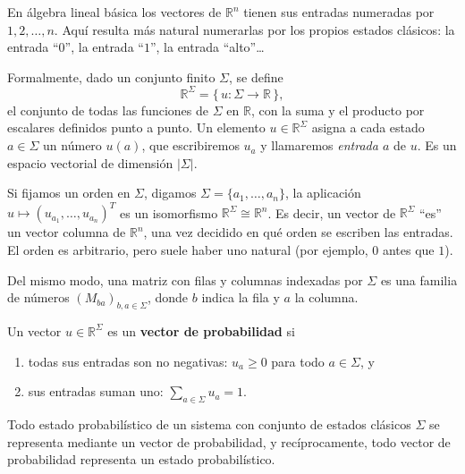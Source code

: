 \documentclass[11pt, a4paper, twoside, openright]{report}
\begin{document}
\begin{tcolorbox}[colback=teal!5!white,colframe=teal!75!black,title=\textbf{Nota Teórica: Vectores indexados por un conjunto}]
En álgebra lineal básica los vectores de $\mathbb{R}^n$ tienen sus entradas numeradas por $1, 2, \dots, n$. Aquí resulta más natural numerarlas por los propios estados clásicos: la entrada ``$0$'', la entrada ``$1$'', la entrada ``alto''\dots

Formalmente, dado un conjunto finito $\Sigma$, se define
\[ \mathbb{R}^{\Sigma} = \{\, u : \Sigma \to \mathbb{R} \,\}, \]
el conjunto de todas las funciones de $\Sigma$ en $\mathbb{R}$, con la suma y el producto por escalares definidos punto a punto. Un elemento $u \in \mathbb{R}^\Sigma$ asigna a cada estado $a \in \Sigma$ un número $u(a)$, que escribiremos $u_a$ y llamaremos \textit{entrada $a$} de $u$. Es un espacio vectorial de dimensión $|\Sigma|$.

Si fijamos un orden en $\Sigma$, digamos $\Sigma = \{a_1, \dots, a_n\}$, la aplicación $u \mapsto (u_{a_1}, \dots, u_{a_n})^T$ es un isomorfismo $\mathbb{R}^\Sigma \cong \mathbb{R}^n$. Es decir, un vector de $\mathbb{R}^\Sigma$ ``es'' un vector columna de $\mathbb{R}^n$, una vez decidido en qué orden se escriben las entradas. El orden es arbitrario, pero suele haber uno natural (por ejemplo, $0$ antes que $1$).

Del mismo modo, una matriz con filas y columnas indexadas por $\Sigma$ es una familia de números $(M_{ba})_{b, a \in \Sigma}$, donde $b$ indica la fila y $a$ la columna.
\end{tcolorbox}

\begin{tcolorbox}[colback=teal!5!white,colframe=teal!75!black,title=\textbf{Definición: Vector de probabilidad}]
Un vector $u \in \mathbb{R}^\Sigma$ es un \textbf{vector de probabilidad} si
\begin{enumerate}
    \item todas sus entradas son no negativas: $u_a \geq 0$ para todo $a \in \Sigma$, y
    \item sus entradas suman uno: $\displaystyle\sum_{a \in \Sigma} u_a = 1$.
\end{enumerate}
Todo estado probabilístico de un sistema con conjunto de estados clásicos $\Sigma$ se representa mediante un vector de probabilidad, y recíprocamente, todo vector de probabilidad representa un estado probabilístico.
\end{tcolorbox}
\end{document}
